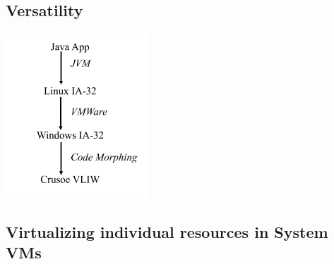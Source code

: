 \documentclass[12pt]{article}
\begin{document}
\subsection{Versatility}
\includegraphics[width=0.4\textwidth]{Versatility.png}

\subsection{Virtualizing individual resources in System VMs}
\end{document}
